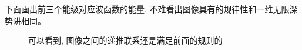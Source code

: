\documentclass[a4paper,zihao=-4,linespread=1]{ctexrep}
\begin{document}
    下面画出前三个能级对应波函数的能量, 不难看出图像具有的规律性和一维无限深势阱相同。
    \begin{figure}[htbp]
        \centering
        \caption{可以看到, 图像之间的递推联系还是满足前面的规则的}
    \end{figure}
\end{document}
